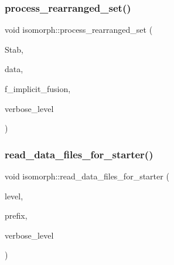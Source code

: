 \mbox{\label{classisomorph_a7767fd5f1da6dfd7f93810be99ba4ab6}} 
\subsubsection{\texorpdfstring{process\+\_\+rearranged\+\_\+set()}{process\_rearranged\_set()}}
{\footnotesize\ttfamily void isomorph\+::process\+\_\+rearranged\+\_\+set (\begin{DoxyParamCaption}\item[{\mbox{\hyperlink{classsims}{sims}} $\ast$}]{Stab,  }\item[{\mbox{\hyperlink{galois_8h_a09fddde158a3a20bd2dcadb609de11dc}{I\+NT}} $\ast$}]{data,  }\item[{\mbox{\hyperlink{galois_8h_a09fddde158a3a20bd2dcadb609de11dc}{I\+NT}}}]{f\+\_\+implicit\+\_\+fusion,  }\item[{\mbox{\hyperlink{galois_8h_a09fddde158a3a20bd2dcadb609de11dc}{I\+NT}}}]{verbose\+\_\+level }\end{DoxyParamCaption})}

\mbox{\label{classisomorph_a388ff858a7a437e12b5a96121294f48f}} 
\subsubsection{\texorpdfstring{read\+\_\+data\+\_\+files\+\_\+for\+\_\+starter()}{read\_data\_files\_for\_starter()}}
{\footnotesize\ttfamily void isomorph\+::read\+\_\+data\+\_\+files\+\_\+for\+\_\+starter (\begin{DoxyParamCaption}\item[{\mbox{\hyperlink{galois_8h_a09fddde158a3a20bd2dcadb609de11dc}{I\+NT}}}]{level,  }\item[{const \mbox{\hyperlink{galois_8h_ab6cc7b4aeb6ea31aba2b3fbfc83ff5e6}{B\+Y\+TE}} $\ast$}]{prefix,  }\item[{\mbox{\hyperlink{galois_8h_a09fddde158a3a20bd2dcadb609de11dc}{I\+NT}}}]{verbose\+\_\+level }\end{DoxyParamCaption})}

